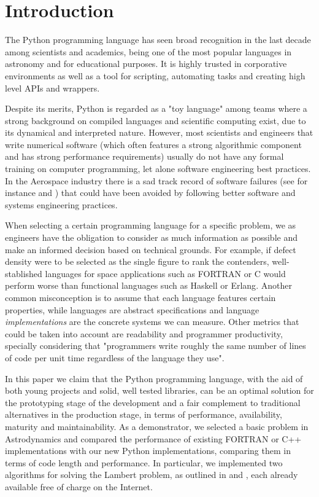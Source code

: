 \section{Introduction}

The Python programming language has seen broad recognition in the last decade among scientists and academics, being one of the most popular languages in astronomy\cite{Robitaille2013} and for educational purposes\cite{guo2014python}. It is highly trusted in corporative environments as well as a tool for scripting, automating tasks and creating high level APIs and wrappers.

Despite its merits, Python is regarded as a "toy language" among teams where a strong background on compiled languages and scientific computing exist, due to its dynamical and interpreted nature. However, most scientists and engineers that write numerical software (which often features a strong algorithmic component and has strong performance requirements) usually do not have any formal training on computer programming, let alone software engineering best practices\cite{Wilson2014}. In the Aerospace industry there is a sad track record of software failures (see for instance \cite{albee2000report} and \cite{lions1996report}) that could have been avoided by following better software and systems engineering practices.

When selecting a certain programming language for a specific problem, we as engineers have the obligation to consider as much information as possible and make an informed decision based on technical grounds. For example, if defect density were to be selected as the single figure to rank the contenders, well-stablished languages for space applications such as FORTRAN or C would perform worse than functional languages such as Haskell or Erlang\cite{Ray2014}. Another common misconception is to assume that each language features certain properties, while languages are abstract specifications and language \textit{implementations} are the concrete systems we can measure. Other metrics that could be taken into account are readability and programmer productivity, specially considering that "programmers write roughly the same number of lines of code per unit time regardless of the language they use"\cite{Wilson2014}.

In this paper we claim that the Python programming language, with the aid of both young projects and solid, well tested libraries, can be an optimal solution for the prototyping stage of the development and a fair complement to traditional alternatives in the production stage, in terms of performance, availability, maturity and maintainability. As a demonstrator, we selected a basic problem in Astrodynamics and compared the performance of existing FORTRAN or C++ implementations with our new Python implementations, comparing them in terms of code length and performance. In particular, we implemented two algorithms for solving the Lambert problem, as outlined in \cite{vallado2001fundamentals} and \cite{Izzo2014}, each already available free of charge on the Internet.

